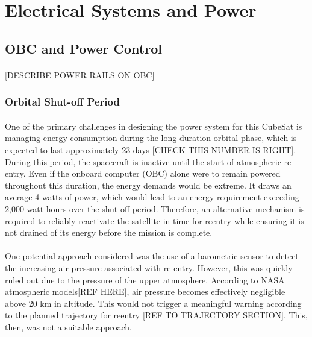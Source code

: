 \documentclass[11pt]{article}
\begin{document}
	\section{Electrical Systems and Power}
	\subsection{OBC and Power Control}
	
	\paragraph{}[DESCRIBE POWER RAILS ON OBC]
	
	\subsubsection{Orbital Shut-off Period}
	
	\paragraph{}One of the primary challenges in designing the power system for this CubeSat is managing energy consumption during the long-duration orbital phase, which is expected to last approximately 23 days [CHECK THIS NUMBER IS RIGHT]. During this period, the spacecraft is inactive until the start of atmospheric re-entry. Even if the onboard computer (OBC) alone were to remain powered throughout this duration, the energy demands would be extreme. It draws an average 4 watts of power, which would lead to an energy requirement exceeding 2,000 watt-hours over the shut-off period. Therefore, an alternative mechanism is required to reliably reactivate the satellite in time for reentry while ensuring it is not drained of its energy before the mission is complete.
	
	\paragraph{}One potential approach considered was the use of a barometric sensor to detect the increasing air pressure associated with re-entry. However, this was quickly ruled out due to the pressure of the upper atmosphere. According to NASA atmospheric models[REF HERE], air pressure becomes effectively negligible above 20 km in altitude. This would not trigger a meaningful warning according to the planned trajectory for reentry [REF TO TRAJECTORY SECTION]. This, then, was not a suitable approach.
	
\end{document}
